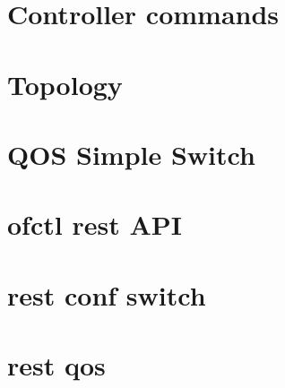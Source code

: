 \documentclass[12pt, a4paper, twoside, openright]{ociamthesis}  %
\begin{document}
\section{Controller commands}\label{Controller_commands}

\section{Topology}\label{Topology}

\section{QOS Simple Switch}\label{qos_simple_switch_13}

\section{ofctl rest API}\label{ofctl_rest}

\section{rest conf switch}\label{rest_conf_switch}

\section{rest qos}\label{rest_qos}

\end{document}
